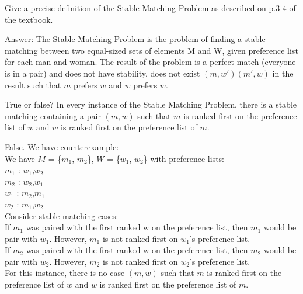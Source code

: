 \documentclass{cpsc413Solutions}
\begin{document}


\begin{problemlist}
\pbitem Give a precise definition of the Stable Matching Problem as described on p.3-4 of the textbook.
\begin{problem}
\begin{answer}
Answer: 
\newline
The Stable Matching Problem is the problem of finding a stable matching between two equal-sized sets of elements M and W, given preference list for each man and woman. The result of the problem is a perfect match (everyone is in a pair) and does not have stability, does not exist $(m,w')(m',w)$ in the result such that $m$ prefers $w$ and $w$ prefers $w$.
\newline

\end{answer}
\end{problem}


\pbitem True or false? In every instance of the Stable Matching Problem, there is a stable matching containing a pair $(m, w)$ such that $m$ is ranked first on the
preference list of $w$ and $w$ is ranked first on the preference list of $m$.
\begin{problem}
\begin{answer}
\newline
False.
We have counterexample: \\
We have $M$ = \{$m_1$, $m_2$\}, $W$ = \{$w_1$, $w_2$\}  with preference lists:\\
$m_1$ : $w_1$,$w_2$\\
$m_2$ : $w_2$,$w_1$\\
$w_1$ : $m_2$,$m_1$\\
$w_2$ : $m_1$,$w_2$\\
Consider stable matching cases:\\
If $m_1$ was paired with the first ranked w on the preference list, then $m_1$ would be pair with $w_1$. However, $m_1$ is not ranked first on $w_1$'s preference list.\\
If $m_2$ was paired with the first ranked w on the preference list, then $m_2$ would be pair with $w_2$. However, $m_2$ is not ranked first on $w_2$'s preference list.\\
For this instance, there is no case $(m, w)$ such that $m$ is ranked first on the
preference list of $w$ and $w$ is ranked first on the preference list of $m$.


\end{answer}
\end{problem}
\end{problemlist}
\end{document}
